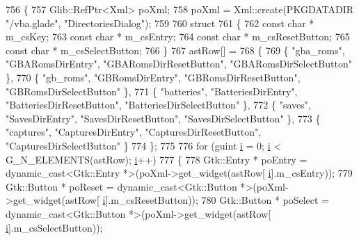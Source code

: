 \begin{DoxyCode}
756 \{
757   Glib::RefPtr<Xml> poXml;
758   poXml = Xml::create(PKGDATADIR \textcolor{stringliteral}{"/vba.glade"}, \textcolor{stringliteral}{"DirectoriesDialog"});
759 
760   \textcolor{keyword}{struct}
761   \{
762     \textcolor{keyword}{const} \textcolor{keywordtype}{char} * m\_csKey;
763     \textcolor{keyword}{const} \textcolor{keywordtype}{char} * m\_csEntry;
764     \textcolor{keyword}{const} \textcolor{keywordtype}{char} * m\_csResetButton;
765     \textcolor{keyword}{const} \textcolor{keywordtype}{char} * m\_csSelectButton;
766   \}
767   astRow[] =
768   \{
769     \{ \textcolor{stringliteral}{"gba\_roms"},  \textcolor{stringliteral}{"GBARomsDirEntry"},   \textcolor{stringliteral}{"GBARomsDirResetButton"},   \textcolor{stringliteral}{"GBARomsDirSelectButton"}   \},
770     \{ \textcolor{stringliteral}{"gb\_roms"},   \textcolor{stringliteral}{"GBRomsDirEntry"},    \textcolor{stringliteral}{"GBRomsDirResetButton"},    \textcolor{stringliteral}{"GBRomsDirSelectButton"}    \},
771     \{ \textcolor{stringliteral}{"batteries"}, \textcolor{stringliteral}{"BatteriesDirEntry"}, \textcolor{stringliteral}{"BatteriesDirResetButton"}, \textcolor{stringliteral}{"BatteriesDirSelectButton"} \},
772     \{ \textcolor{stringliteral}{"saves"},     \textcolor{stringliteral}{"SavesDirEntry"},     \textcolor{stringliteral}{"SavesDirResetButton"},     \textcolor{stringliteral}{"SavesDirSelectButton"}     \},
773     \{ \textcolor{stringliteral}{"captures"},  \textcolor{stringliteral}{"CapturesDirEntry"},  \textcolor{stringliteral}{"CapturesDirResetButton"},  \textcolor{stringliteral}{"CapturesDirSelectButton"}  \}
774   \};
775 
776   \textcolor{keywordflow}{for} (guint \mbox{\hyperlink{expr-lex_8cpp_acb559820d9ca11295b4500f179ef6392}{i}} = 0; \mbox{\hyperlink{expr-lex_8cpp_acb559820d9ca11295b4500f179ef6392}{i}} < G\_N\_ELEMENTS(astRow); \mbox{\hyperlink{expr-lex_8cpp_acb559820d9ca11295b4500f179ef6392}{i}}++)
777   \{
778     Gtk::Entry *  poEntry  = \textcolor{keyword}{dynamic\_cast<}Gtk::Entry *\textcolor{keyword}{>}(poXml->get\_widget(astRow[
      \mbox{\hyperlink{expr-lex_8cpp_acb559820d9ca11295b4500f179ef6392}{i}}].m\_csEntry));
779     Gtk::Button * poReset  = \textcolor{keyword}{dynamic\_cast<}Gtk::Button *\textcolor{keyword}{>}(poXml->get\_widget(astRow[
      \mbox{\hyperlink{expr-lex_8cpp_acb559820d9ca11295b4500f179ef6392}{i}}].m\_csResetButton));
780     Gtk::Button * poSelect = \textcolor{keyword}{dynamic\_cast<}Gtk::Button *\textcolor{keyword}{>}(poXml->get\_widget(astRow[
      \mbox{\hyperlink{expr-lex_8cpp_acb559820d9ca11295b4500f179ef6392}{i}}].m\_csSelectButton));

\end{DoxyCode}
